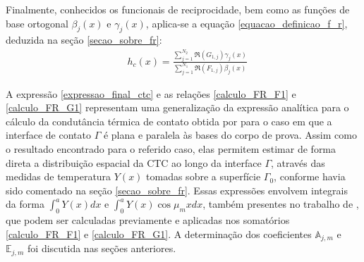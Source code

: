 Finalmente, conhecidos os funcionais de reciprocidade, bem como as funções de base ortogonal $\beta_j(x)$ e $\gamma_j(x)$, aplica-se a equação \eqref{equacao_definicao_f_r}, deduzida na seção \ref{secao_sobre_fr}:
\begin{align}
& h_c(x) %
= \frac{\displaystyle\sum_{j=1}^{N_2} \Re(G_{1,j}) \gamma_j(x)}{\displaystyle\sum_{j=1}^{N_1} \Re(F_{1,j}) \beta_j(x)} \label{expressao_final_ctc}
\end{align}

A expressão \eqref{expressao_final_ctc} e as relações \eqref{calculo_FR_F1} e \eqref{calculo_FR_G1} representam uma generalização da expressão analítica para o cálculo da condutância térmica de contato obtida por \cite{tese_padilha} para o caso em que a interface de contato $\Gamma$ é plana e paralela às bases do corpo de prova. Assim como o resultado encontrado para o referido caso, elas permitem estimar de forma direta a distribuição espacial da CTC ao longo da interface $\Gamma$, através das medidas de temperatura $Y(x)$ tomadas sobre a superfície $\Gamma_0$, conforme havia sido comentado na seção \ref{secao_sobre_fr}. Essas expressões envolvem integrais da forma $\displaystyle \int_0^a Y(x)dx$ e $\displaystyle \int_0^a Y(x)\cos\mu_m x dx$, também presentes no trabalho de \cite{tese_padilha}, que podem ser calculadas previamente e aplicadas nos somatórios \eqref{calculo_FR_F1} e \eqref{calculo_FR_G1}. A determinação dos coeficientes $\mathbb{A}_{j,m}$ e $\mathbb{E}_{j,m}$ foi discutida nas seções anteriores.

